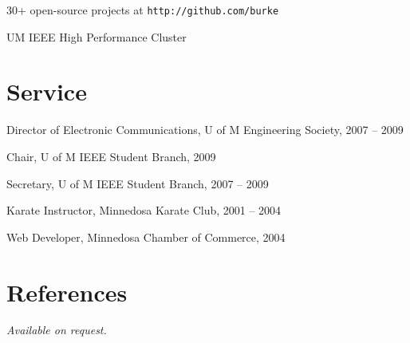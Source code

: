 \documentclass[margin,line,letterpaper]{resume}
\begin{document}
\begin{resume}
  \begin{list2}
  \item 30+ open-source projects at {\tt http://github.com/burke}
  \item UM IEEE High Performance Cluster
  \end{list2}

  \section{\mysidestyle Service}

  \begin{list2}
    \item Director of Electronic Communications, U of M Engineering Society, 2007 -- 2009
    \item Chair, U of M IEEE Student Branch, 2009
    \item Secretary, U of M IEEE Student Branch, 2007 -- 2009
    \item Karate Instructor, Minnedosa Karate Club, 2001 -- 2004
    \item Web Developer, Minnedosa Chamber of Commerce, 2004
  \end{list2}

  \section{\mysidestyle References}

  {\sl Available on request.}

\end{resume}
\end{document}
